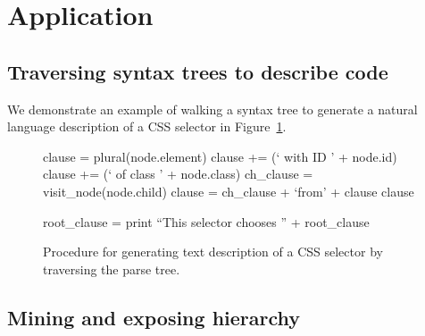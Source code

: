 \section{Application}

\subsection{Traversing syntax trees to describe code}

We demonstrate an example of walking a syntax tree to generate a natural language description of a CSS selector in Figure~\ref{alg:css_traversal}.

\begin{figure}
\begin{algorithmic}

    \State clause = plural(node.element)
        \State clause += (` with ID ' + node.id)
        \State clause += (` of class ' + node.class)
    \EndIf
        \State ch\_clause = visit\_node(node.child)
        \State clause = ch\_clause + `from' + clause
    \EndIf
    \State \Return clause
\EndFunction

\State
{}
    \State root\_clause = 
    \State print ``This selector chooses '' + root\_clause
\EndFunction

\end{algorithmic}
\label{alg:css_traversal}
\caption{Procedure for generating text description of a CSS selector by traversing the parse tree.
}
\end{figure}

\subsection{Mining and exposing hierarchy}

\begin{figure}
\end{figure}

